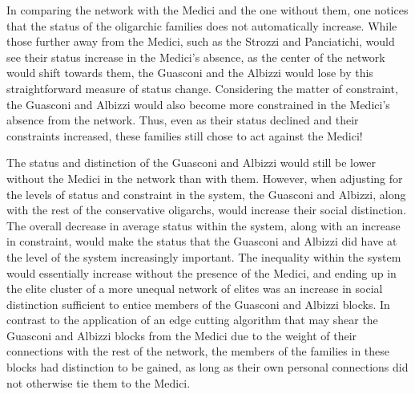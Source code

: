 \documentclass[12pt]{article}
\begin{document}




In comparing the network with the Medici and the one without them, one notices that the status of the oligarchic families does not automatically increase. While those further away from the Medici, such as the Strozzi and Panciatichi, would see their status increase in the Medici’s absence, as the center of the network would shift towards them, the Guasconi and the Albizzi would lose by this straightforward measure of status change. Considering the matter of constraint, the Guasconi and Albizzi would also become more constrained in the Medici's absence from the network. Thus, even as their status declined and their constraints increased, these families still chose to act against the Medici! 

The status and distinction of the Guasconi and Albizzi would still be lower without the Medici in the network than with them. However, when adjusting for the levels of status and constraint in the system, the Guasconi and Albizzi, along with the rest of the conservative oligarchs, would increase their social distinction. The overall decrease in average status within the system, along with an increase in constraint, would make the status that the Guasconi and Albizzi did have at the level of the system increasingly important. The inequality within the system would essentially increase without the presence of the Medici, and ending up in the elite cluster of a more unequal network of elites was an increase in social distinction sufficient to entice members of the Guasconi and Albizzi blocks. In contrast to the application of an edge cutting algorithm that may shear the Guasconi and Albizzi blocks from the Medici due to the weight of their connections with the rest of the network, the members of the families in these blocks had distinction to be gained, as long as their own personal connections did not otherwise tie them to the Medici.  
\end{document}
